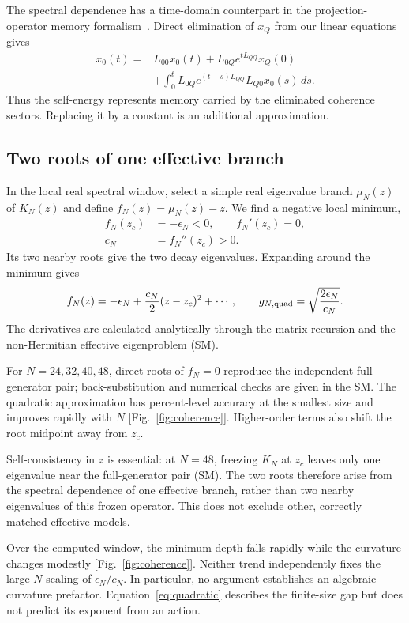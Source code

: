 \documentclass[aps,pra,twocolumn,superscriptaddress,amsmath,amssymb,reprint,floatfix]{revtex4-2}
\begin{document}
The spectral dependence has a time-domain counterpart in the projection-operator memory formalism~\cite{Nakajima1958,Zwanzig1960}. Direct elimination of $x_Q$ from our linear equations gives
\begin{align}
 \dot x_0(t)={}&L_{00}x_0(t)+L_{0Q}e^{tL_{QQ}}x_Q(0)\nonumber\\
 &+\int_0^t L_{0Q}e^{(t-s)L_{QQ}}L_{Q0}x_0(s)\,ds.
 \label{eq:memory}
\end{align}
Thus the self-energy represents memory carried by the eliminated coherence sectors. Replacing it by a constant is an additional approximation.

\subsection{Two roots of one effective branch}
In the local real spectral window, select a simple real eigenvalue branch $\mu_N(z)$ of $K_N(z)$ and define $f_N(z)=\mu_N(z)-z$. We find a negative local minimum,
\begin{align}
 f_N(z_c)&=-\epsilon_N<0,\qquad f_N'(z_c)=0,\nonumber\\
 c_N&=f_N''(z_c)>0.
\end{align}
Its two nearby roots give the two decay eigenvalues. Expanding around the minimum gives
\begin{equation}
 f_N(z)=-\epsilon_N+\frac{c_N}{2}(z-z_c)^2+\cdots,
 \qquad g_{N,\rm quad}=\sqrt{\frac{2\epsilon_N}{c_N}}.
 \label{eq:quadratic}
\end{equation}
The derivatives are calculated analytically through the matrix recursion and the non-Hermitian effective eigenproblem (SM).

For $N=24,32,40,48$, direct roots of $f_N=0$ reproduce the independent full-generator pair; back-substitution and numerical checks are given in the SM. The quadratic approximation has percent-level accuracy at the smallest size and improves rapidly with $N$ [Fig.~\ref{fig:coherence}]. Higher-order terms also shift the root midpoint away from $z_c$.

Self-consistency in $z$ is essential: at $N=48$, freezing $K_N$ at $z_c$ leaves only one eigenvalue near the full-generator pair (SM). The two roots therefore arise from the spectral dependence of one effective branch, rather than two nearby eigenvalues of this frozen operator. This does not exclude other, correctly matched effective models.

Over the computed window, the minimum depth falls rapidly while the curvature changes modestly [Fig.~\ref{fig:coherence}]. Neither trend independently fixes the large-$N$ scaling of $\epsilon_N/c_N$. In particular, no argument establishes an algebraic curvature prefactor. Equation~\eqref{eq:quadratic} describes the finite-size gap but does not predict its exponent from an action.
\end{document}
